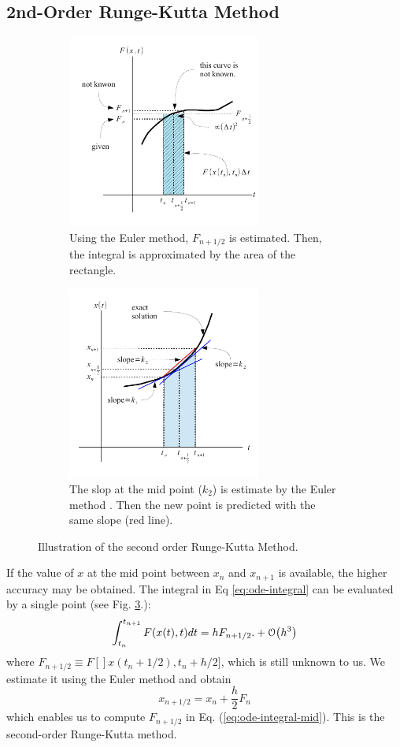 \noindent
\subsection{2nd-Order Runge-Kutta Method}\label{sec:Runge-Kutta}

\begin{figure}
	\begin{subfigure}{0.45\textwidth}
		\centering
		\includegraphics[height=2.5in]{05.ode1/runge-integral.pdf}
\caption{Using the Euler method, $F_{n+1/2}$ is estimated. Then, the integral is approximated by the area of the rectangle.}
\label{fig:runge-integral}
	\end{subfigure}
	\begin{subfigure}{0.45\textwidth}
		\centering 
		\includegraphics[height=2.5in]{05.ode1/runge-x.pdf}
\caption{The slop at the mid point ($k_2$) is estimate by the Euler method . Then the new point is predicted with the same slope (red line).}
\label{fig:runge-x}
	\end{subfigure}
\caption{Illustration of the second order Runge-Kutta Method.}
\label{fig:runge-kutta-rule}
\end{figure}

If the value of $x$ at the mid point between $x_n$ and $x_{n+1}$ 
is available, the higher
accuracy may be obtained. The integral in Eq 
\eqref{eq:ode-integral} can be evaluated by a single point (see Fig. \ref{fig:runge-kutta-rule}.):
\begin{equation}\label{eq:ode-integral-mid}
\int_{t_n}^{t_{n+1}} F(x(t),t) dt = h F_{n+1/2}.
 + \order{h^3}
\end{equation}
where $F_{n+1/2} \equiv F[]x(t_n+1/2),t_n + h/2]$, which is still unknown to us. 
We estimate it using the Euler method and obtain
\begin{equation}
x_{n+1/2} = x_n + \frac{h}{2} F_n
\label{eq:runge-mid}
\end{equation}
which enables us to compute $F_{n+1/2}$ in Eq. (\ref{eq:ode-integral-mid}). This is the second-order Runge-Kutta method. 

